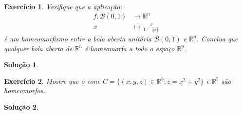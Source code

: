 \documentclass[a4paper,12pt]{article}
\newcommand{\R}{\mathbb{R}}
\newcommand{\B}{\mathcal{B}}
\theoremstyle{exer}
\newtheorem{exercise}{Exercício}
\theoremstyle{definition}
\newtheorem{solution}{Solução}
\theoremstyle{plain}
\begin{document}
\begin{exercise}
    Verifique que a aplicação:
    \begin{align*}
        f : \B(0, 1) &\to \R^n \\
        x &\mapsto \frac{x}{1 - ||x||}        
    \end{align*}
    é um homeomorfismo entre a bola aberta unitária $\B(0, 1)$ e $\R^n$.
    Conclua que qualquer bola aberta de $\R^n$ é homeomorfa a todo o espaço $\R^n$.
\end{exercise}

\begin{solution}
    
\end{solution}

\begin{exercise}
    Mostre que o cone $C = \{(x, y, z) \in \R^3 ; z = x^2 + y^2 \}$ e $\R^2$ são homeomorfos.
\end{exercise}

\begin{solution}
    
\end{solution}

\end{document}
